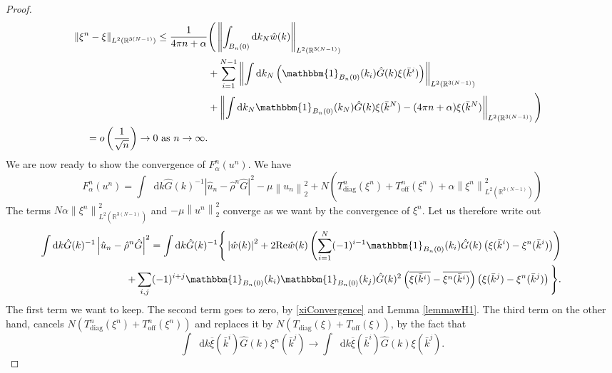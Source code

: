 \documentclass[a4paper,11pt]{article}
\newcommand{\Real}{\text{Re}}
\newcommand{\norm}[1]{\left\lVert #1 \right\rVert}
\newcommand{\abs}[1]{\left\lvert #1 \right\rvert}
\newcommand*\diff{\mathop{}\!\mathrm{d}}
\newcommand{\R}{\mathbb{R}}
\numberwithin{equation}{section}
\begin{document}
\begin{proof}
\begin{equation}
\begin{aligned}
	\hspace*{-0.3cm}\norm{\xi^n-\xi}_{L^{2}(\R^{3(N-1)}) }\leq\frac{1}{4\pi n+\alpha}&\Bigg(\norm{\int_{B_n(0)}\diff k_N \hat{w}(k)}_{L^{2}(\R^{3(N-1)}) }\\&+\sum_{i=1}^{N-1}\norm{\int\diff k_N\left(\mathbbm{1}_{B_n(0)}(k_i)\hat{G}(k)\xi(\bar{k}^i)\right)}_{L^{2}(\R^{3(N-1)}) }\\&+\norm{\int \diff k_N \mathbbm{1}_{B_n(0)}(k_N)\hat{G}(k)\xi(\bar{k}^N)-(4\pi n+\alpha)\xi(\bar{k}^N)}_{L^2(\R^{3(N-1)})}\Bigg)\\
	=o\left(\frac{1}{\sqrt{n}}\right)\to 0\text{ as }n\to\infty.
	\end{aligned}
	\end{equation}
We are now ready to show the convergence of $ F_\alpha^n(u^n) $. We have \begin{equation}
F_\alpha^n(u^n)=\int\diff k \hat{G}(k)^{-1}\abs{\hat{u}_n-\hat{\rho}^n\hat{G}}^2-\mu\norm{u_n}^2_2+N\left(T^n_{\text{diag}}(\xi^n)+T^n_{\text{off}}(\xi^n)+\alpha\norm{\xi^n}^2_{L^2(\R^{3(N-1)})}\right)
\end{equation}
The terms $ N\alpha\norm{\xi^n}^2_{L^2(\R^{3(N-1)})} $ and $ -\mu\norm{u^n}^2_2 $ converge as we want by the convergence of $ \xi^n $. Let us therefore write out\begin{equation}
\begin{aligned}
\hspace*{-0.8cm}\int\diff k \hat{G}(k)^{-1}\abs{\hat{u}_n-\hat{\rho}^n\hat{G}}^2=\int\diff k \hat{G}(k)^{-1}\Bigg\{\abs{\hat{w}(k)}^2+2\Real\hat{w}(k)\left(\sum_{i=1}^{N}(-1)^{i-1}\mathbbm{1}_{B_n(0)}(k_i)\hat{G}(k)\left(\xi(\bar{k}^i)-\xi^n(\bar{k}^i)\right)\right)\\
+\sum_{i,j}(-1)^{i+j}\mathbbm{1}_{B_n(0)}(k_i)\mathbbm{1}_{B_n(0)}(k_j)\hat{G}(k)^2\left(\overline{\xi(\bar{k}^i)}-\overline{\xi^n(\bar{k}^i)}\right)\left(\xi(\bar{k}^j)-\xi^n(\bar{k}^j)\right)\Bigg\}.
\end{aligned}
\end{equation}
The first term we want to keep. The second term goes to zero, by \eqref{xiConvergence} and Lemma \ref{lemmawH1}. The third term on the other hand, cancels $ N\left(T^n_{\text{diag}}(\xi^n)+T^n_{\text{off}}(\xi^n)\right) $ and replaces it by $ N\left(T_{\text{diag}}(\xi)+T_{\text{off}}(\xi)\right) $, by the fact that \begin{equation}
\int\diff k\overline{\xi}(\bar{k}^i)\hat{G}(k)\xi^n(\bar{k}^j)\to\int\diff k\overline{\xi}(\bar{k}^i)\hat{G}(k)\xi(\bar{k}^j).
\end{equation}

\end{proof}
\end{document}
